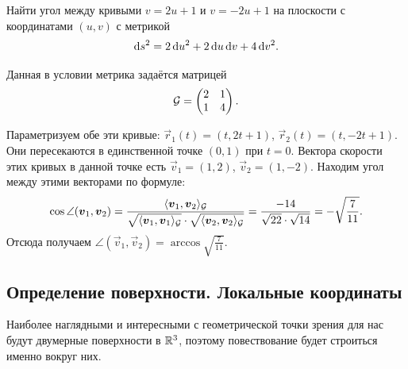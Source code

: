 \begin{problem}
	Найти угол между кривыми $v = 2u + 1$ и $v = -2u + 1$ на плоскости с координатами $(u, v)$ с метрикой
	\[
		\mathop{}\!\mathrm{d} s^2 = 2\mathop{}\!\mathrm{d} u^2 + 2\mathop{}\!\mathrm{d} u\mathop{}\!\mathrm{d} v + 4\mathop{}\!\mathrm{d} v^2.
	\]
\end{problem}

\begin{solution}
	Данная в условии метрика задаётся матрицей
	\[
		\mathcal{G} =
		\begin{pmatrix}
			2 & 1\\
			1 & 4
		\end{pmatrix}.
	\]

	Параметризуем обе эти кривые: $\vec{r}_1(t) = (t, 2t + 1)$, $\vec{r}_2(t) = (t, -2t + 1)$. Они пересекаются в единственной точке $(0, 1)$ при $t = 0$. Вектора скорости этих кривых в данной точке есть $\vec{v}_1 = (1, 2)$, $\vec{v}_2 = (1, -2)$. Находим угол между этими векторами по формуле:
	\[
		\cos\angle(\boldsymbol{v}_1, \boldsymbol{v}_2) = \frac{\langle\boldsymbol{v}_1, \boldsymbol{v}_2\rangle_{\mathcal{G}}}{\sqrt{\langle\boldsymbol{v}_1, \boldsymbol{v}_1\rangle_{\mathcal{G}}} \cdot \sqrt{\langle\boldsymbol{v}_2, \boldsymbol{v}_2\rangle_{\mathcal{G}}}} = \frac{-14}{\sqrt{22} \cdot \sqrt{14}} = -\sqrt{\frac{7}{11}}.
	\]
	Отсюда получаем $\angle(\vec{v}_1, \vec{v}_2) = \arccos\sqrt{\frac{7}{11}}$.
\end{solution}

\subsection{Определение поверхности. Локальные координаты}

Наиболее наглядными и интересными с геометрической точки зрения для нас будут двумерные поверхности в $\mathbb{R}^3$, поэтому повествование будет строиться именно вокруг них.

